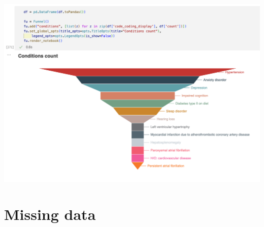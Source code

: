 \documentclass[11pt, oneside]{article}
\begin{document}
\begin{center}
\includegraphics[scale=0.5]{1_funnel.png}
\end{center}

\section{Missing data}
\end{document}
